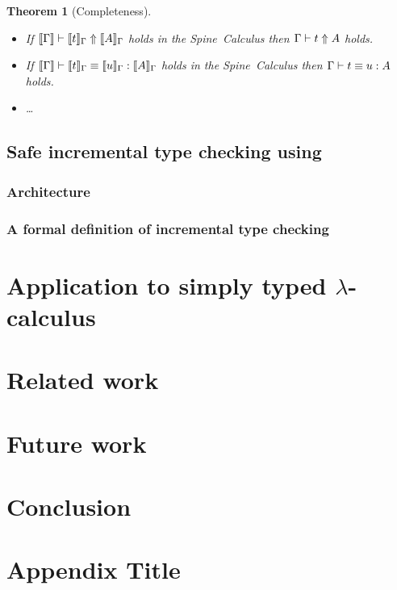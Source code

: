 \documentclass[9pt,authoryear]{sigplanconf}
\newtheorem{theorem}{Theorem}
\begin{document}
\begin{theorem}[Completeness]\ \\[-1em]
\begin{itemize}
\item  If $\llbracket \Gamma \rrbracket \vdash \llbracket t \rrbracket_{\Gamma} \Uparrow \llbracket A \rrbracket_{\Gamma}$ 
holds in the Spine~Calculus then $\Gamma \vdash t \Uparrow A$ holds.
\item If
$\llbracket \Gamma \rrbracket \vdash \llbracket t \rrbracket_{\Gamma} \equiv \llbracket u \rrbracket_{\Gamma} : \llbracket A \rrbracket_{\Gamma}$ holds in the Spine~Calculus
then $\Gamma \vdash t \equiv u : A$ holds.
\item \ldots
\end{itemize}
\end{theorem}

\subsection{Safe incremental type checking using {\system}}

\subsubsection{Architecture}

\subsubsection{A formal definition of incremental type checking}

\section{Application to simply typed $\lambda$-calculus}

\section{Related work}

\section{Future work}

\section{Conclusion}

\appendix
\section{Appendix Title}
\end{document}

